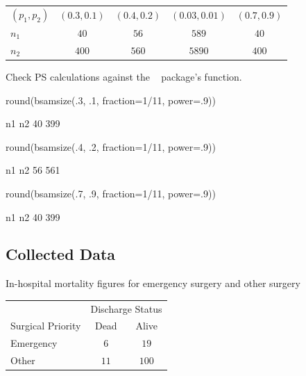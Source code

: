 \begin{table}[!hbp]
 \begin{center}
 \begin{tabular}{lcccc} \hline\hline
$(p_1, p_2)$ &\boldmath$(0.3, 0.1)$&$(0.4, 0.2)$&$(0.03, 0.01)$&$(0.7, 0.9)$ \\ 
$n_1$  &\boldmath$40$&$56$&$589$&$40$ \\ 
$n_2$  &\boldmath$400$&$560$&$5890$&$400$ \\ \hline \hline
\end{tabular}
\end{center}
\end{table}
Check PS calculations against the \R\  package's
 function.
\begin{Schunk}
\begin{Sinput}
round(bsamsize(.3, .1, fraction=1/11, power=.9))
\end{Sinput}
\begin{Soutput}
 n1  n2 
 40 399 
\end{Soutput}
\begin{Sinput}
round(bsamsize(.4, .2, fraction=1/11, power=.9))
\end{Sinput}
\begin{Soutput}
 n1  n2 
 56 561 
\end{Soutput}
\begin{Sinput}
round(bsamsize(.7, .9, fraction=1/11, power=.9))
\end{Sinput}
\begin{Soutput}
 n1  n2 
 40 399 
\end{Soutput}
\end{Schunk}

\subsection{Collected Data}

In-hospital mortality figures for emergency surgery and other surgery

\begin{table}[!hbp]
 \begin{center}
 \begin{tabular}{l|cc}
 & \multicolumn{2}{|c}{Discharge Status} \\
Surgical Priority& Dead& Alive \\ \hline
Emergency&$6$&$ 19$\\
Other&$11$&$100$\\
\end{tabular}
\end{center}
\end{table}

